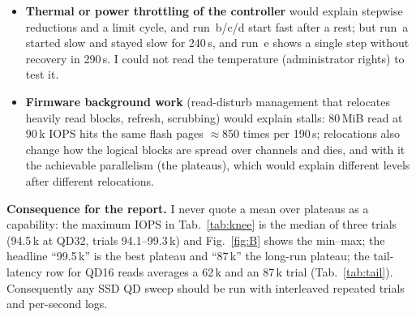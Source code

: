﻿\documentclass[10.5pt]{article}
\begin{document}
\begin{itemize}
  \item \textbf{Thermal or power throttling of the controller} would explain stepwise reductions and a limit cycle, and run~b/c/d start fast after a rest; but run~a started slow and stayed slow for 240\,s, and run~e shows a single step without recovery in 290\,s. I could not read the temperature (administrator rights) to test it.
  \item \textbf{Firmware background work} (read-disturb management that relocates heavily read blocks, refresh, scrubbing) would explain stalls: 80\,MiB read at 90\,k IOPS hits the same flash pages $\approx$850 times per 190\,s; relocations also change how the logical blocks are spread over channels and dies, and with it the achievable parallelism (the plateaus), which would explain different levels after different relocations.
\end{itemize}
\textbf{Consequence for the report.} I never quote a mean over plateaus as a capability: the maximum IOPS in Tab.~\ref{tab:knee} is the median of three trials (94.5\,k at QD32, trials 94.1--99.3\,k) and Fig.~\ref{fig:B} shows the min--max; the headline ``99.5\,k'' is the best plateau and ``87\,k'' the long-run plateau; the tail-latency row for QD16 reads averages a 62\,k and an 87\,k trial (Tab.~\ref{tab:tail}). Consequently any SSD QD sweep should be run with interleaved repeated trials and per-second logs.
\end{document}
